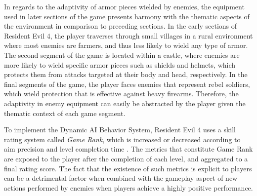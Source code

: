 In regards to the adaptivity of armor pieces wielded by enemies, the equipment used in later sections of the game presents harmony with the thematic aspects of the environment in comparison to preceding sections. In the early sections of Resident Evil 4, the player traverses through small villages in a rural environment where most enemies are farmers, and thus less likely to wield any type of armor. The second segment of the game is located within a castle, where enemies are more likely to wield specific armor pieces such as shields and helmets, which protects them from attacks targeted at their body and head, respectively. In the final segments of the game, the player faces enemies that represent rebel soldiers, which wield protection that is effective against heavy firearms. Therefore, the adaptivity in enemy equipment can easily be abstracted by the player given the thematic context of each game segment.


To implement the Dynamic AI Behavior System, Resident Evil 4 uses a skill rating system called \emph{Game Rank}, which is increased or decreased according to aim precision and level completion time \cite{RE4_JP_StrategyGuide}. The metrics that constitute Game Rank are exposed to the player after the completion of each level, and aggregated to a final rating score. The fact that the existence of such metrics is explicit to players can be a detrimental factor when combined with the gameplay aspect of new actions performed by enemies when players achieve a highly positive performance.

